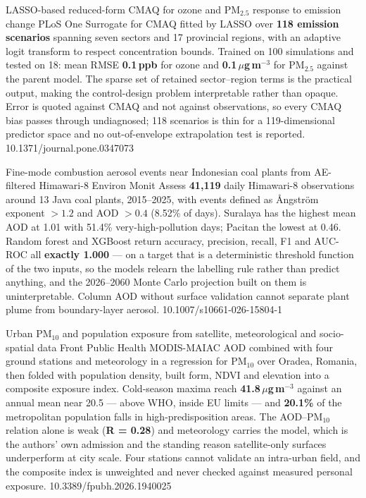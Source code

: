 \documentclass[10pt]{article}
\begin{document}
{LASSO-based reduced-form CMAQ for ozone and PM$_{2.5}$ response to emission change}
{PLoS One}
{Surrogate for CMAQ fitted by LASSO over \textbf{118 emission scenarios} spanning seven
sectors and 17 provincial regions, with an adaptive logit transform to respect
concentration bounds. Trained on 100 simulations and tested on 18: mean RMSE
\textbf{0.1\,ppb} for ozone and \textbf{0.1\,$\mu$g\,m$^{-3}$} for PM$_{2.5}$ against the
parent model. The sparse set of retained sector--region terms is the practical output,
making the control-design problem interpretable rather than opaque. Error is quoted
against CMAQ and not against observations, so every CMAQ bias passes through undiagnosed;
118 scenarios is thin for a 119-dimensional predictor space and no out-of-envelope
extrapolation test is reported.}
{10.1371/journal.pone.0347073}

{Fine-mode combustion aerosol events near Indonesian coal plants from AE-filtered Himawari-8}
{Environ Monit Assess}
{\textbf{41{,}119} daily Himawari-8 observations around 13 Java coal plants, 2015--2025,
with events defined as \r{A}ngstr\"om exponent $>1.2$ and AOD $>0.4$ (8.52\% of days).
Suralaya has the highest mean AOD at 1.01 with 51.4\% very-high-pollution days; Pacitan
the lowest at 0.46. Random forest and XGBoost return accuracy, precision, recall, F1 and
AUC-ROC all \textbf{exactly 1.000} --- on a target that is a deterministic threshold
function of the two inputs, so the models relearn the labelling rule rather than predict
anything, and the 2026--2060 Monte Carlo projection built on them is uninterpretable.
Column AOD without surface validation cannot separate plant plume from boundary-layer
aerosol.}
{10.1007/s10661-026-15804-1}

{Urban PM$_{10}$ and population exposure from satellite, meteorological and socio-spatial data}
{Front Public Health}
{MODIS-MAIAC AOD combined with four ground stations and meteorology in a regression for
PM$_{10}$ over Oradea, Romania, then folded with population density, built form, NDVI and
elevation into a composite exposure index. Cold-season maxima reach
\textbf{41.8\,$\mu$g\,m$^{-3}$} against an annual mean near 20.5 --- above WHO, inside EU
limits --- and \textbf{20.1\%} of the metropolitan population falls in
high-predisposition areas. The AOD--PM$_{10}$ relation alone is weak
(\textbf{R = 0.28}) and meteorology carries the model, which is the authors' own admission
and the standing reason satellite-only surfaces underperform at city scale. Four stations
cannot validate an intra-urban field, and the composite index is unweighted and never
checked against measured personal exposure.}
{10.3389/fpubh.2026.1940025}
\end{document}
